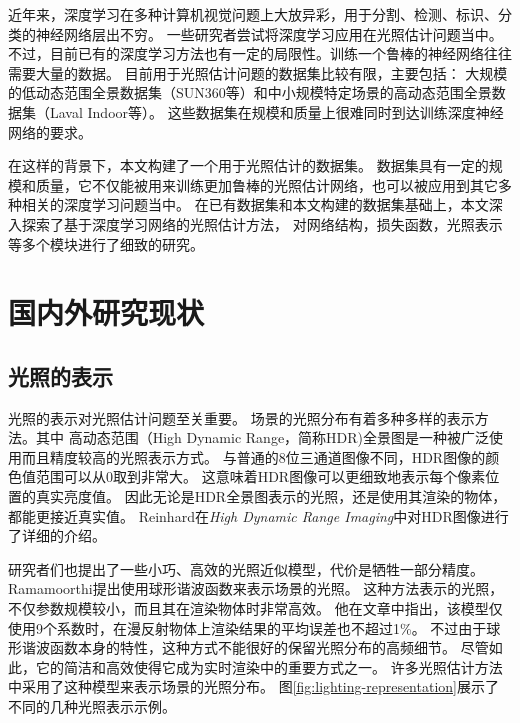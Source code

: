 近年来，深度学习在多种计算机视觉问题上大放异彩，用于分割、检测、标识、分类的神经网络层出不穷。
一些研究者尝试将深度学习应用在光照估计问题当中。
不过，目前已有的深度学习方法也有一定的局限性。训练一个鲁棒的神经网络往往需要大量的数据。
目前用于光照估计问题的数据集比较有限，主要包括：
大规模的低动态范围全景数据集（SUN360等）和中小规模特定场景的高动态范围全景数据集（Laval Indoor等）。
这些数据集在规模和质量上很难同时到达训练深度神经网络的要求。

在这样的背景下，本文构建了一个用于光照估计的数据集。
数据集具有一定的规模和质量，它不仅能被用来训练更加鲁棒的光照估计网络，也可以被应用到其它多种相关的深度学习问题当中。
在已有数据集和本文构建的数据集基础上，本文深入探索了基于深度学习网络的光照估计方法，
对网络结构，损失函数，光照表示等多个模块进行了细致的研究。

\section{国内外研究现状}
\subsection{光照的表示}
光照的表示对光照估计问题至关重要。
场景的光照分布有着多种多样的表示方法。其中
高动态范围（High Dynamic Range，简称HDR)全景图是一种被广泛使用而且精度较高的光照表示方式。
与普通的8位三通道图像不同，HDR图像的颜色值范围可以从0取到非常大。
这意味着HDR图像可以更细致地表示每个像素位置的真实亮度值。
因此无论是HDR全景图表示的光照，还是使用其渲染的物体，都能更接近真实值。
Reinhard在\textit{High Dynamic Range Imaging}\cite{reinhard2005high}中对HDR图像进行了详细的介绍。

研究者们也提出了一些小巧、高效的光照近似模型，代价是牺牲一部分精度。
Ramamoorthi\cite{ramamoorthi2001efficient}提出使用球形谐波函数来表示场景的光照。
这种方法表示的光照，不仅参数规模较小，而且其在渲染物体时非常高效。
他在文章中指出，该模型仅使用9个系数时，在漫反射物体上渲染结果的平均误差也不超过1\%。
不过由于球形谐波函数本身的特性，这种方式不能很好的保留光照分布的高频细节。
尽管如此，它的简洁和高效使得它成为实时渲染中的重要方式之一\cite{green2003spherical,sloan2008stupid}。
许多光照估计方法中采用了这种模型来表示场景的光照分布。
图\ref{fig:lighting-representation}展示了不同的几种光照表示示例。


